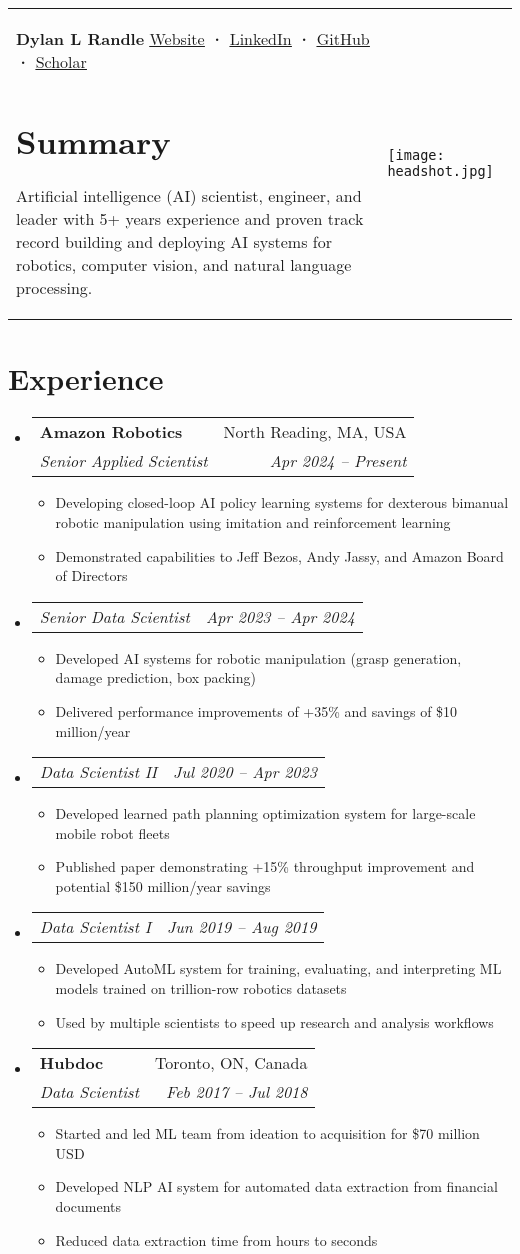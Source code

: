 \documentclass[a4paper,11pt]{article}
\makeatletter
\newcommand{\resumeItem}[1]{
  \item\small{#1}
}
\newcommand{\resumeItemListStart}{\begin{itemize}[rightmargin=0.11in]}
\newcommand{\resumeItemListEnd}{\end{itemize}}
\newcommand{\resumeQuadHeading}[4]{
  \item
  \begin{tabular*}{0.96\textwidth}[t]{l@{\extracolsep{\fill}}r}
    \textbf{#1} & #2 \\
    \textit{\small#3} & \textit{\small #4} \\
  \end{tabular*}
}
\newcommand{\resumeQuadHeadingChild}[2]{
  \item
  \begin{tabular*}{0.96\textwidth}[t]{l@{\extracolsep{\fill}}r}
    \textit{\small#1} & \textit{\small#2} \\
  \end{tabular*}
}
\newcommand{\resumeHeadingListStart}{
  \begin{itemize}[leftmargin=0.15in, label={}]
}
\newcommand{\resumeHeadingListEnd}{\end{itemize}}
\makeatother
\begin{document}
\begin{tabularx}{\linewidth}{@{}m{} m{}@{}}
{
    \textbf{\Huge Dylan L Randle \vspace{2pt}} \newline
    \href{https://dylanrandle.github.io/}{\uline{Website}} \textbf{·}
    \href{https://linkedin.com/in/dylanrandle}{\uline{LinkedIn}} \textbf{·}
    \href{https://github.com/dylanrandle}{\uline{GitHub}} \textbf{·}
    \href{https://scholar.google.com/citations?user=62z1l9cAAAAJ}{\uline{Scholar}}
    \section{Summary}
    \small{
      Artificial intelligence (AI) scientist, engineer, and leader with 5+ years experience and proven track record building and deploying AI systems for robotics, computer vision, and natural language processing.
    }
} & 
{
    \hfill
    \texttt{[image: headshot.jpg]}
}
\end{tabularx}


\section{Experience}
\resumeHeadingListStart{}
  \resumeQuadHeading{Amazon Robotics}{North Reading, MA, USA}{Senior Applied Scientist}{Apr 2024 -- Present}
    \resumeItemListStart
      \resumeItem{Developing closed-loop AI policy learning systems for dexterous bimanual robotic manipulation using imitation and reinforcement learning}
      \resumeItem{Demonstrated capabilities to Jeff Bezos, Andy Jassy, and Amazon Board of Directors}
    \resumeItemListEnd
  \resumeQuadHeadingChild{Senior Data Scientist}{Apr 2023 -- Apr 2024}
    \resumeItemListStart
      \resumeItem{Developed AI systems for robotic manipulation (grasp generation, damage prediction, box packing)}
      \resumeItem{Delivered performance improvements of +35\% and savings of \$10 million/year}
    \resumeItemListEnd
  \resumeQuadHeadingChild{Data Scientist II}{Jul 2020 -- Apr 2023}
    \resumeItemListStart
      \resumeItem{Developed learned path planning optimization system for large-scale mobile robot fleets}
      \resumeItem{Published paper demonstrating +15\% throughput improvement and potential \$150 million/year savings}
    \resumeItemListEnd
  \resumeQuadHeadingChild{Data Scientist I}{Jun 2019 -- Aug 2019}
    \resumeItemListStart
      \resumeItem{Developed AutoML system for training, evaluating, and interpreting ML models trained on trillion-row robotics datasets}
      \resumeItem{Used by multiple scientists to speed up research and analysis workflows}
    \resumeItemListEnd
  \resumeQuadHeading{Hubdoc}{Toronto, ON, Canada}
  {Data Scientist}{Feb 2017 -- Jul 2018}
    \resumeItemListStart{}
        \resumeItem{Started and led ML team from ideation to acquisition for \$70 million USD}
        \resumeItem{Developed NLP AI system for automated data extraction from financial documents}
        \resumeItem{Reduced data extraction time from hours to seconds}
    \resumeItemListEnd{}
\resumeHeadingListEnd{}
\end{document}
